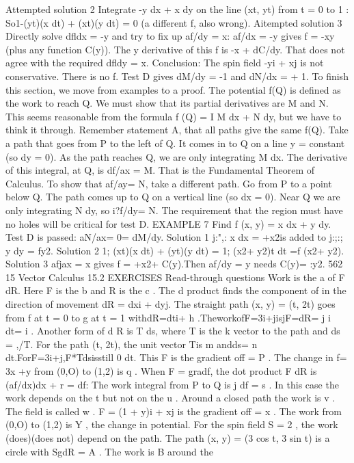 Attempted solution 2 Integrate -y dx + x dy on the line (xt, yt) from t = 0 to 1 :
So1-(yt)(x dt) + (xt)(y dt) = 0 (a different f, also wrong).
Aitempted solution 3 Directly solve dfldx = -y and try to fix up af/dy = x:
af/dx = -y gives f = -xy (plus any function C(y)).
The y derivative of this f is -x + dC/dy. That does not agree with the required
dfldy = x. Conclusion: The spin field -yi + xj is not conservative. There is no f.
Test D gives dM/dy = -1 and dN/dx = + 1.
To finish this section, we move from examples to a proof. The potential f(Q) is
defined as the work to reach Q. We must show that its partial derivatives are M and
N. This seems reasonable from the formula f (Q) = I M dx + N dy, but we have to
think it through.
Remember statement A, that all paths give the same f(Q). Take a path that goes
from P to the left of Q. It comes in to Q on a line y = constant (so dy = 0). As the
path reaches Q, we are only integrating M dx. The derivative of this integral, at Q, is
df/ax = M. That is the Fundamental Theorem of Calculus.
To show that af/ay= N, take a different path. Go from P to a point below Q. The
path comes up to Q on a vertical line (so dx = 0). Near Q we are only integrating
N dy, so i?f/dy= N.
The requirement that the region must have no holes will be critical for test D.
EXAMPLE 7 Find f (x, y) = x dx + y dy. Test D is passed: aN/ax= 0= dM/dy.
Solution 1 j:",: x dx = +x2is added to j:;:; y dy = fy2.
Solution 2 1; (xt)(x dt) + (yt)(y dt) = 1; (x2+ y2)t dt =f (x2+ y2).
Solution 3 afjax = x gives f = +x2+ C(y).Then af/dy = y needs C(y)= :y2. 
562 15 Vector Calculus
15.2 EXERCISES
Read-through questions
Work is the a of F dR. Here F is the b and R is
the c . The d product finds the component of
in the direction of movement dR = dxi + dyj. The straight
path (x, y) = (t, 2t) goes from f at t = 0 to g at t =
1 withdR=dti+ h .TheworkofF=3i+jisjF=dR=
j i dt= i .
Another form of d R is T ds, where T is the k vector to
the path and ds = ,/T. For the path (t, 2t), the unit vector
Tis m andds= n dt.ForF=3i+j,F*Tdsisstill
0 dt. This F is the gradient off = P . The change in
f= 3x +y from (0,O) to (1,2) is q .
When F = gradf, the dot product F dR is (af/dx)dx + r = df: The work integral from P to Q is j df = s . In this case the work depends on the t but not on the
u . Around a closed path the work is v . The field is
called w . F = (1 + y)i + xj is the gradient off = x .
The work from (0,O) to (1,2) is Y , the change in potential.
For the spin field S = 2 , the work (does)(does not)
depend on the path. The path (x, y) = (3 cos t, 3 sin t) is a
circle with SgdR = A . The work is B around the
